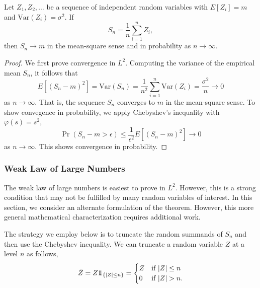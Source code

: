 \begin{theorem}
Let $Z_1, Z_2, \ldots$ be a sequence of independent random variables with $E [Z_i] = m$ and $\mathrm{Var}(Z_i) = \sigma^2$.
If
\begin{equation*}
S_n = \frac{1}{n} \sum_{i=1}^n Z_i ,
\end{equation*}
then $S_n \rightarrow m$ in the mean-square sense and in probability as $n \rightarrow \infty$.
\end{theorem}
\begin{proof}
We first prove convergence in $L^2$.
Computing the variance of the empirical mean $S_n$, it follows that
\begin{equation*}
E \left[ ( S_n - m )^2 \right]
= \mathrm{Var} ( S_n )
= \frac{1}{n^2} \sum_{i=1}^n \mathrm{Var} (Z_i)
= \frac{\sigma^2}{n} \rightarrow 0
\end{equation*}
as $n \rightarrow \infty$.
That is, the sequence $S_n$ converges to $m$ in the mean-square sense.
To show convegence in probability, we apply Chebyshev's inequality with $\varphi (s) = s^2$,
\begin{equation*}
\Pr ( S_n - m > \epsilon )
\leq \frac{1}{\epsilon^2} E \left[ ( S_n - m )^2 \right]
\rightarrow 0
\end{equation*}
as $n \rightarrow \infty$.
This shows convergence in probability.
\end{proof}

\subsubsection{Weak Law of Large Numbers}

The weak law of large numbers is easiest to prove in $L^2$.
However, this is a strong condition that may not be fulfilled by many random variables of interest.
In this section, we consider an alternate formulation of the theorem.
However, this more general mathematical characterization requires additional work.

The strategy we employ below is to truncate the random summands of $S_n$ and then use the Chebyshev inequality.
We can truncate a random variable $Z$ at a level $n$ as follows,
\begin{equation*}
\bar{Z} = Z \mathrm{1\!\!1}_{\{ |Z| \leq n \}}
= \begin{cases} Z & \text{if } |Z| \leq n \\
0 & \text{if } |Z| > n . \end {cases}
\end{equation*}

